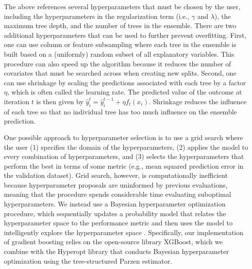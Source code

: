\documentclass[english]{article}
\begin{document}
The above references several hyperparameters that must be chosen by the user, including the 
hyperparameters in the regularization term (i.e., $\gamma$ and $\lambda$), the maximum tree depth, and 
the number of trees in the ensemble. 
There are two additional hyperparameters that can be used to further prevent overfitting.
First, one can use column or feature subsampling where each tree in the ensemble is built based on a
(uniformly) random subset of all explanatory variables.
This procedure can also speed up the algorithm because it reduces the number of covariates that 
must be searched across when creating new splits.
Second, one can use shrinkage by scaling the predictions associated with each tree by a factor $\eta$,
which is often called the learning rate.
The predicted value of the outcome at iteration $t$ is then given by $\hat{y}_i^t = 
\hat{y}_i^{t-1} + \eta f_t(x_i)$.
Shrinkage reduces the influence of each tree so that no individual tree has too much influence on the
ensemble prediction.

One possible approach to hyperparameter selection is to use a grid search where the user (1) specifies
the domain of the hyperparameters, (2) applies the model to every combination of hyperparameters,
and (3) selects the hyperparameters that perform the best in terms of some metric (e.g., mean squared
prediction error in the validation dataset).
Grid search, however, is computationally inefficient because hyperparameter proposals are uninformed
by previous evaluations, meaning that the procedure spends considerable time evaluating suboptimal
hyperparameters.
We instead use a Bayesian hyperparameter optimization procedure, which sequentially updates a probability 
model that relates the hyperparameter space to the performance metric and then uses the model to 
intelligently explore the hyperparameter space \citep{bergstra2011algorithms}.
Specifically, our implementation of gradient boosting relies on the open-source library XGBoost, which
we combine with the Hyperopt library that conducts Bayesian hyperparameter optimization using
the tree-structured Parzen estimator.




\newpage
\cleardoublepage



\end{document}
